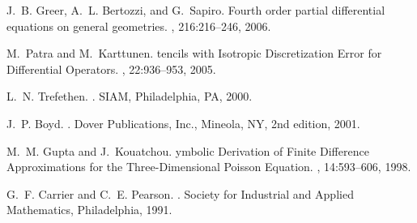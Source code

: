 \documentclass[fleqn,12pt,twoside]{article}
\begin{document}
\begin{thebibliography}{10}
J.~B. Greer, A.~L. Bertozzi, and G.~Sapiro.
\newblock Fourth order partial differential equations on general geometries.
, 216:216--246, 2006.

M.~Patra and M.~Karttunen.
tencils with {I}sotropic {D}iscretization {E}rror for
  {D}ifferential {O}perators.
, 22:936--953, 2005.

L.~N. Trefethen.
.
\newblock SIAM, Philadelphia, PA, 2000.

J.~P. Boyd.
.
\newblock Dover Publications, Inc., Mineola, NY, 2nd edition, 2001.

M.~M. Gupta and J.~Kouatchou.
ymbolic {D}erivation of {F}inite {D}ifference {A}pproximations for
  the {T}hree-{D}imensional {P}oisson {E}quation.
, 14:593--606, 1998.

G.~F. Carrier and C.~E. Pearson.
.
\newblock Society for Industrial and Applied Mathematics, Philadelphia, 1991.

\end{thebibliography}
\end{document}
